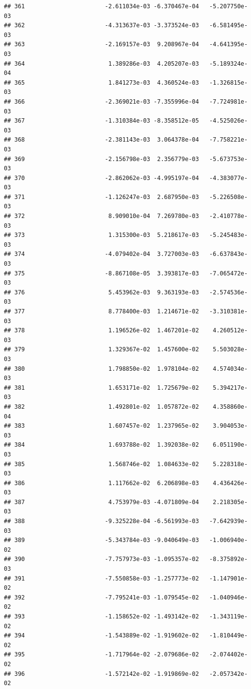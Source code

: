 \documentclass[
]{article}
\begin{document}
\begin{verbatim}
## 361                       -2.611034e-03 -6.370467e-04   -5.207750e-03
## 362                       -4.313637e-03 -3.373524e-03   -6.581495e-03
## 363                       -2.169157e-03  9.208967e-04   -4.641395e-03
## 364                        1.389286e-03  4.205207e-03   -5.189324e-04
## 365                        1.841273e-03  4.360524e-03   -1.326815e-03
## 366                       -2.369021e-03 -7.355996e-04   -7.724981e-03
## 367                       -1.310384e-03 -8.358512e-05   -4.525026e-03
## 368                       -2.381143e-03  3.064378e-04   -7.758221e-03
## 369                       -2.156798e-03  2.356779e-03   -5.673753e-03
## 370                       -2.862062e-03 -4.995197e-04   -4.383077e-03
## 371                       -1.126247e-03  2.687950e-03   -5.226508e-03
## 372                        8.909010e-04  7.269780e-03   -2.410778e-03
## 373                        1.315300e-03  5.218617e-03   -5.245483e-03
## 374                       -4.079402e-04  3.727003e-03   -6.637843e-03
## 375                       -8.867108e-05  3.393817e-03   -7.065472e-03
## 376                        5.453962e-03  9.363193e-03   -2.574536e-03
## 377                        8.778400e-03  1.214671e-02   -3.310381e-03
## 378                        1.196526e-02  1.467201e-02    4.260512e-03
## 379                        1.329367e-02  1.457600e-02    5.503028e-03
## 380                        1.798850e-02  1.978104e-02    4.574034e-03
## 381                        1.653171e-02  1.725679e-02    5.394217e-03
## 382                        1.492801e-02  1.057872e-02    4.358860e-04
## 383                        1.607457e-02  1.237965e-02    3.904053e-03
## 384                        1.693788e-02  1.392038e-02    6.051190e-03
## 385                        1.568746e-02  1.084633e-02    5.228318e-03
## 386                        1.117662e-02  6.206898e-03    4.436426e-03
## 387                        4.753979e-03 -4.071809e-04    2.218305e-03
## 388                       -9.325228e-04 -6.561993e-03   -7.642939e-03
## 389                       -5.343784e-03 -9.040649e-03   -1.006940e-02
## 390                       -7.757973e-03 -1.095357e-02   -8.375892e-03
## 391                       -7.550858e-03 -1.257773e-02   -1.147901e-02
## 392                       -7.795241e-03 -1.079545e-02   -1.040946e-02
## 393                       -1.158652e-02 -1.493142e-02   -1.343119e-02
## 394                       -1.543889e-02 -1.919602e-02   -1.810449e-02
## 395                       -1.717964e-02 -2.079686e-02   -2.074402e-02
## 396                       -1.572142e-02 -1.919869e-02   -2.057342e-02

\end{verbatim}
\end{document}
